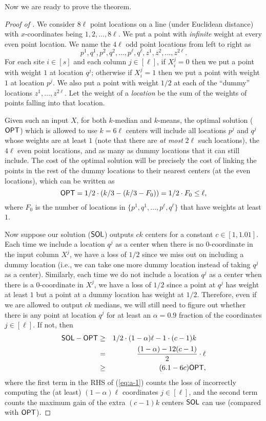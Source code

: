 Now we are ready to prove the theorem.
\begin{proof}[Proof of  ]
We consider $8 \ell$ point locations on a line (under Euclidean distance) with $x$-coordinates being $1, 2, \ldots, 8 \ell$. We put a point with {\em infinite} weight at every even point location. We name the $4 \ell$ odd point locations from left to right as 
$$p^1, q^1, p^2, q^2, \ldots, p^{\ell}, q^{\ell}, z^1, z^2, \ldots, z^{2\ell}.$$  
For each site $i \in [s]$ and each column $j \in [\ell]$, if $X_i^j = 0$ then we put a point with weight $1$ at location $q^j$; otherwise if $X_i^j = 1$ then we put a point with weight $1$ at location $p^j$.  We also put a point with weight $1/2$ at each of the ``dummy'' locations $z^1, \ldots, z^{2\ell}$.  Let the weight of a {\em location} be the sum of the weights of points falling into that location.

Given such an input $X$, for both $k$-median and $k$-means, the optimal solution ($\mathsf{OPT}$) which is allowed to use $k = 6\ell$ centers will include all locations $p^j$ and $q^j$ whose weights are at least $1$ (note that there are {\em at most} $2\ell$ such locations), the $4 \ell$ even point locations, and as many as dummy locations that it can still include.  The cost of the optimal solution will be precisely the cost of linking the points in the rest of the dummy locations to their nearest centers (at the even locations), which can be written as
$$\mathsf{OPT} = 1/2 \cdot (k/3 - (k/3 - F_0)) = 1/2 \cdot F_0 \le \ell,$$
where $F_0$ is the number of locations in $\{p^1, q^1, \ldots, p^\ell, q^\ell\}$ that have weights at least $1$.

Now suppose our solution ($\mathsf{SOL}$) outputs $c k$ centers for a constant $c \in [1, 1.01]$. Each time we include a  location $q^j$ as a center when there is no $0$-coordinate in the input column $X^j$, we have a loss of $1/2$ since we miss out on including a dummy location (i.e., we can take one more dummy location instead of taking $q^j$ as a center). Similarly, each time we do not include a location $q^j$ as a center when there is a $0$-coordinate in $X^j$, we have a loss of $1/2$ since a point at $q^j$ has weight at least $1$ but a point at a dummy location has weight at $1/2$. Therefore, even if we are allowed to output $c k$ medians, we will still need to figure out whether there is any point at location $q^j$ for at least an $\alpha = 0.9$ fraction of the coordinates $j \in [\ell]$. If not, then
\begin{eqnarray}
\mathsf{SOL} - \mathsf{OPT} &\ge& {1}/{2} \cdot (1 - \alpha) \ell - 1 \cdot (c - 1) k \label{eq:a-1} \ \ \ \ \\
&= & \frac{(1 - \alpha) - 12(c - 1)}{2} \cdot \ell \nonumber \\
&\ge& (6.1 - 6c) \mathsf{OPT}, \nonumber
\end{eqnarray}
where the first term in the RHS of (\ref{eq:a-1}) counts the loss of incorrectly computing the (at least) $(1-\alpha) \ell$ coordinates $j \in [\ell]$, and the second term counts the maximum gain of the extra $(c - 1) k$ centers $\mathsf{SOL}$ can use (compared with $\mathsf{OPT}$). 


\end{proof}
